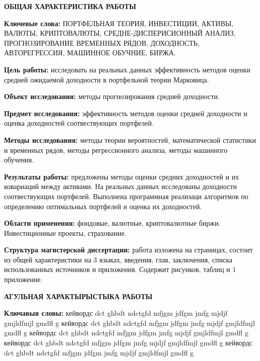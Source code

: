 \newpage
{}


\begin{center}
	\textbf{\large ОБЩАЯ ХАРАКТЕРИСТИКА РАБОТЫ}
\end{center}


\textbf{Ключевые слова:}
ПОРТФЕЛЬНАЯ ТЕОРИЯ, ИНВЕСТИЦИИ, АКТИВЫ, ВАЛЮТЫ, КРИПТОВАЛЮТЫ, СРЕДНЕ-ДИСПЕРИСИОННЫЙ АНАЛИЗ, ПРОГНОЗИРОВАНИЕ ВРЕМЕННЫХ РЯДОВ,
ДОХОДНОСТЬ, АВТОРЕГРЕССИЯ, МАШИННОЕ ОБУЧНИЕ, БИРЖА.

\textbf{Цель работы:} 
исследовать на реальных данных эффективность методов оценки средней ожидаемой доходности в портфельной теории Марковица.

\textbf{Объект исследования:} 
методы прогнозирования средней доходности.

\textbf{Предмет исследования:}
эффективность методов оценки средней доходности и оценка доходностей соотвествующих портфелей.

\textbf{Методы исследования:}
методы теории вероятностей, математической статистики и временных рядов, методы регрессионного анализа, методы машинного обучения.

\textbf{Результаты работы:}
предложены методы оценки средних доходностей и их ковариаций между активами. На реальных данных исследованы доходности соотвествующих портфелей.
Выполнена программная реализаци алгоритмов по определению оптимальных портфелей и оценка их доходностей.

\textbf{Области применения:}
фондовые, валютные, криптовалютные биржи. Инвестиционные проекты, страхование.

\textbf{Структура магистерской диссертации:}
работа изложена на \pageref{LastPage} страницах, состоит из общей характеристики на 3 языках, введения, 
\totalchapters{} глав, заключения, списка использованных источников и приложения.
Содержит \totalfigures{} рисунков, \totaltables{} таблиц и 1 приложение.

\newpage
{}
\begin{center}
	\textbf{\large АГУЛЬНАЯ ХАРАКТЫРЫСТЫКА РАБОТЫ}
\end{center}

\textbf{Ключавыя словы:} кейвордс dct ghbdt ndctgfd mfjgm jdfgm jmfg mjdjf gmjldfmjl gmdfl g
кейвордс dct ghbdt ndctgfd mfjgm jdfgm jmfg mjdjf gmjldfmjl gmdfl g
кейвордс dct ghbdt ndctgfd mfjgm jdfgm jmfg mjdjf gmjldfmjl gmdfl g
кейвордс dct ghbdt ndctgfd mfjgm jdfgm jmfg mjdjf gmjldfmjl gmdfl g
кейвордс dct ghbdt ndctgfd mfjgm jdfgm jmfg mjdjf gmjldfmjl gmdfl g

